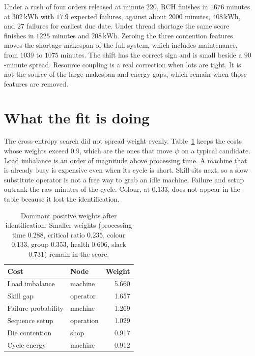 \documentclass[10pt,a4paper]{article}
\begin{document}
Under a rush of four orders released at minute \(220\), RCH finishes in \(1676\) minutes at \(302\,\mathrm{kWh}\) with \(17.9\) expected failures, against about \(2000\) minutes, \(408\,\mathrm{kWh}\), and \(27\) failures for earliest due date. Under thread shortage the same score finishes in \(1225\) minutes and \(208\,\mathrm{kWh}\). Zeroing the three contention features moves the shortage makespan of the full system, which includes maintenance, from \(1039\) to \(1075\) minutes. The shift has the correct sign and is small beside a \(90\)-minute spread. Resource coupling is a real correction when lots are tight. It is not the source of the large makespan and energy gaps, which remain when those features are removed.

\section{What the fit is doing}

The cross-entropy search did not spread weight evenly. Table~\ref{tab:w} keeps the costs whose weights exceed \(0.9\), which are the ones that move \(\psi\) on a typical candidate. Load imbalance is an order of magnitude above processing time. A machine that is already busy is expensive even when its cycle is short. Skill sits next, so a slow substitute operator is not a free way to grab an idle machine. Failure and setup outrank the raw minutes of the cycle. Colour, at \(0.133\), does not appear in the table because it lost the identification.

\begin{table}[ht]
\centering
\caption{Dominant positive weights after identification. Smaller weights (processing time \(0.288\), critical ratio \(0.235\), colour \(0.133\), group \(0.353\), health \(0.606\), slack \(0.731\)) remain in the score.}
\label{tab:w}
\small
\begin{tabular}{llr}
\toprule
Cost & Node & Weight \\
\midrule
Load imbalance & machine & 5.660 \\
Skill gap & operator & 1.657 \\
Failure probability & machine & 1.269 \\
Sequence setup & operation & 1.029 \\
Die contention & shop & 0.917 \\
Cycle energy & machine & 0.912 \\
\bottomrule
\end{tabular}
\end{table}
\end{document}

